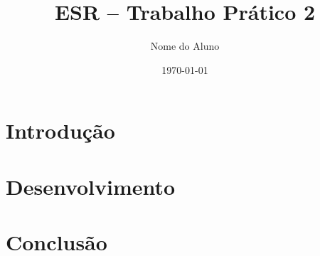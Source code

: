 \documentclass[11pt,a4paper]{article}
\title{ESR -- Trabalho Prático 2}
\author{Nome do Aluno}
\date{\today}
\begin{document}
\maketitle
\tableofcontents
\newpage

\section{Introdução}

\section{Desenvolvimento}



\section{Conclusão}
\end{document}
